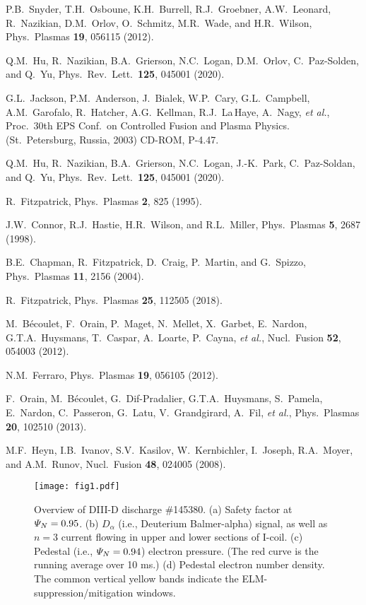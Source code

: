 \documentclass[12pt,prb,aps]{revtex4-1}
\begin{document}
\begin{thebibliography}{99}
 P.B.~Snyder, T.H.~Osboune, K.H.~Burrell, R.J.~Groebner, A.W.~Leonard, R.~Nazikian, D.M.~Orlov, O.~Schmitz, M.R.~Wade, and H.R.~Wilson, 
 Phys.\ Plasmas {\bf 19}, 056115 (2012).

 Q.M.~Hu, R.~Nazikian, B.A.~Grierson, N.C.~Logan, D.M.~Orlov, C.~Paz-Solden, and Q.~Yu, 
Phys.\ Rev.\ Lett.\ {\bf 125}, 045001 (2020).

 G.L.~Jackson, P.M.~Anderson, J.~Bialek, W.P.~Cary, G.L.~Campbell, A.M.~Garofalo,  R.~Hatcher, A.G.~Kellman, R.J.~La\,Haye, A.~Nagy, {\em et al.},  
Proc.\ 30th EPS Conf.\ on Controlled Fusion and Plasma Physics. (St.\ Petersburg, Russia, 2003) CD-ROM, P-4.47.

 Q.M.~Hu,  R.~Nazikian,  B.A.~Grierson,  N.C.~Logan,  J.-K.~Park,  C.~Paz-Soldan, and Q.~Yu, Phys.\ Rev.\ Lett.\ {\bf 125}, 045001 (2020).

 R.~Fitzpatrick, Phys.\ Plasmas {\bf 2}, 825 (1995).

 J.W.~Connor,  R.J.~Hastie, H.R.~Wilson, and R.L.~Miller, Phys.\ Plasmas  {\bf 5}, 2687 (1998).

 B.E.~Chapman, R.~Fitzpatrick, D.~Craig, P.~Martin, and G.~Spizzo, Phys.\ Plasmas {\bf 11}, 2156 (2004).

 R.~Fitzpatrick, Phys.\ Plasmas {\bf 25}, 112505 (2018).

 M.~B\'{e}coulet, F.~Orain, P.~Maget, N.~Mellet, X.~Garbet, E.~Nardon, G.T.A.~Huysmans, T.~Caspar, A.~Loarte,  P.~Cayna, {\em et al.}, 
Nucl.\ Fusion {\bf 52}, 054003  (2012).

 N.M.~Ferraro, Phys.\ Plasmas {\bf 19}, 056105  (2012).

 F.~Orain, M.~B\'{e}coulet, G.~Dif-Pradalier, G.T.A.~Huysmans, S.~Pamela,   E.~Nardon, C.~Passeron, G.~Latu, V.~Grandgirard, A.~Fil, {\em et al.}, 
Phys.\ Plasmas {\bf 20}, 102510 (2013). 

 M.F.~Heyn, I.B.~Ivanov, S.V.~Kasilov, W.~Kernbichler, I.~Joseph, R.A.~Moyer,  and A.M.~Runov, Nucl.\ Fusion {\bf 48}, 024005 (2008). 

\end{thebibliography}

\newpage

\begin{figure}
\texttt{[image: fig1.pdf]}
\caption{Overview of DIII-D discharge \#145380.
(a) Safety factor at  ${\mit\Psi}_N=0.95$. 
(b) $D_\alpha$ (i.e., Deuterium Balmer-alpha) signal, as well as $n=3$ current flowing in upper and lower sections of I-coil. 
(c) Pedestal (i.e., ${\mit\Psi}_N=0.94$)
electron pressure. (The red curve is the running average over 10 ms.) (d) Pedestal electron number density. The common vertical yellow bands indicate the ELM-suppression/mitigation windows.}\label{fig1}
\end{figure}
\end{document}
